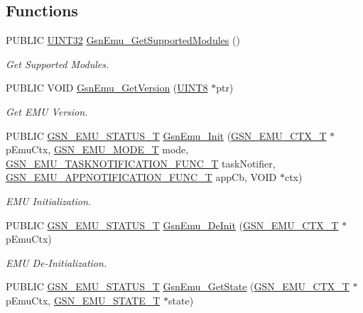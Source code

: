 \subsection*{Functions}
\begin{DoxyCompactItemize}
\item 
PUBLIC \hyperlink{a00660_gae1e6edbbc26d6fbc71a90190d0266018}{UINT32} \hyperlink{a00663_ga93436d9f7d75c34e8ed04ecfe64fd85d}{GsnEmu\_\-GetSupportedModules} ()
\begin{DoxyCompactList}\small\item\em Get Supported Modules. \end{DoxyCompactList}\item 
PUBLIC VOID \hyperlink{a00663_ga551937ea94e20c352ead797411954bdf}{GsnEmu\_\-GetVersion} (\hyperlink{a00660_gab27e9918b538ce9d8ca692479b375b6a}{UINT8} $\ast$ptr)
\begin{DoxyCompactList}\small\item\em Get EMU Version. \end{DoxyCompactList}\item 
PUBLIC \hyperlink{a00490_aeda27e2bd7f74b1b9748e313d272033e}{GSN\_\-EMU\_\-STATUS\_\-T} \hyperlink{a00663_ga2cffc4817a2de4ab6d96a6f9d6af298c}{GsnEmu\_\-Init} (\hyperlink{a00059}{GSN\_\-EMU\_\-CTX\_\-T} $\ast$pEmuCtx, \hyperlink{a00663_gafbaa4d30aa4b736f3465344d6a5935b0}{GSN\_\-EMU\_\-MODE\_\-T} mode, \hyperlink{a00490_a05b3306759ea16994bc2d9055424367e}{GSN\_\-EMU\_\-TASKNOTIFICATION\_\-FUNC\_\-T} taskNotifier, \hyperlink{a00489_ab0fa7e48e947d0a8dd37314d7aee6ba7}{GSN\_\-EMU\_\-APPNOTIFICATION\_\-FUNC\_\-T} appCb, VOID $\ast$ctx)
\begin{DoxyCompactList}\small\item\em EMU Initialization. \end{DoxyCompactList}\item 
PUBLIC \hyperlink{a00490_aeda27e2bd7f74b1b9748e313d272033e}{GSN\_\-EMU\_\-STATUS\_\-T} \hyperlink{a00663_ga24d2ae83a520429e6c8d5070a84244f7}{GsnEmu\_\-DeInit} (\hyperlink{a00059}{GSN\_\-EMU\_\-CTX\_\-T} $\ast$pEmuCtx)
\begin{DoxyCompactList}\small\item\em EMU De-\/Initialization. \end{DoxyCompactList}\item 
PUBLIC \hyperlink{a00490_aeda27e2bd7f74b1b9748e313d272033e}{GSN\_\-EMU\_\-STATUS\_\-T} \hyperlink{a00663_gaf76a2b11343bf595609446ea8926ba4a}{GsnEmu\_\-GetState} (\hyperlink{a00059}{GSN\_\-EMU\_\-CTX\_\-T} $\ast$pEmuCtx, \hyperlink{a00663_gab09444b3018b5461230d789c746b56a0}{GSN\_\-EMU\_\-STATE\_\-T} $\ast$state)

\end{DoxyCompactItemize}
